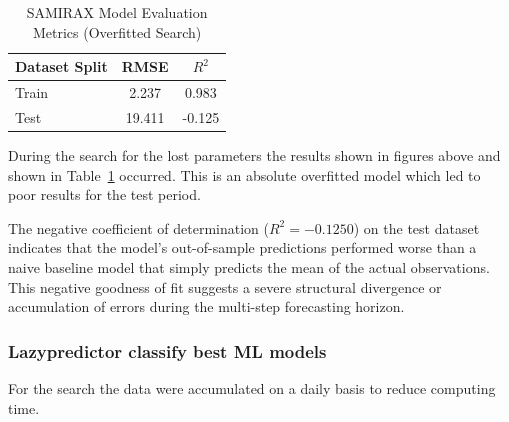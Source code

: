 \documentclass[a4paper,12pt]{article}
\begin{document}
\begin{description}
    \begin{table}[H]
        \centering
        \caption{SAMIRAX Model Evaluation Metrics (Overfitted Search)}
        \label{tab:samirax_metrics_overfitted}
        \begin{tabular}{lcc}
            \toprule
            \textbf{Dataset Split} & \textbf{RMSE} & \textbf{\(R^2\)} \\ 
            \midrule
            Train                  & 2.237         & 0.983             \\ 
            Test                   & 19.411        & -0.125            \\ 
            \bottomrule
        \end{tabular}
    \end{table}
    
    During the search for the lost parameters the results shown in figures above and shown in Table~\ref{tab:samirax_metrics_overfitted} occurred. This is an absolute overfitted model which led to poor results for the test period. 
    
    The negative coefficient of determination ($R^2 = -0.1250$) on the test dataset indicates that the model's out-of-sample predictions performed worse than a naive baseline model that simply predicts the mean of the actual observations. This negative goodness of fit suggests a severe structural divergence or accumulation of errors during the multi-step forecasting horizon.

\end{description}

\subsubsection{Lazypredictor classify best ML models}

For the search the data were accumulated on a daily basis to reduce computing time.
\end{document}
